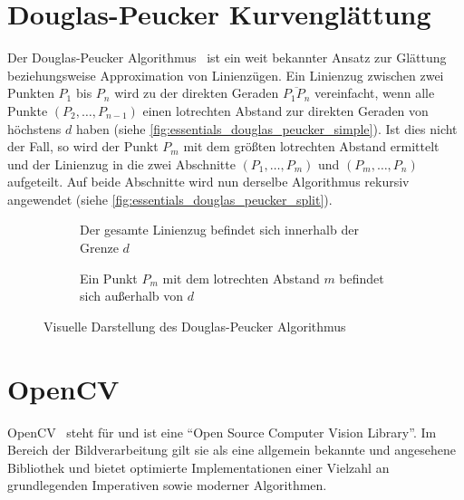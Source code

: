 \clearpage
\section{Douglas-Peucker Kurvenglättung}%
\label{sec:essentials_douglas_peucker}

Der Douglas-Peucker Algorithmus~\cite{doi:10.3138/FM57-6770-U75U-7727} ist ein weit bekannter Ansatz zur Glättung beziehungsweise Approximation von Linienzügen.
Ein Linienzug zwischen zwei Punkten \(P_1\) bis \(P_n\) wird zu der direkten Geraden \(\overline{P_1 P_n}\) vereinfacht, wenn alle Punkte \((P_2, \ldots, P_{n-1})\) einen lotrechten Abstand zur direkten Geraden von höchstens \(d\) haben (siehe \autoref{fig:essentials_douglas_peucker_simple}).
Ist dies nicht der Fall, so wird der Punkt \(P_m\) mit dem größten lotrechten Abstand ermittelt und der Linienzug in die zwei Abschnitte \((P_1, \ldots, P_m)\) und \((P_m, \ldots, P_n)\) aufgeteilt.
Auf beide Abschnitte wird nun derselbe Algorithmus rekursiv angewendet (siehe \autoref{fig:essentials_douglas_peucker_split}).

\mbox{}

\begin{figure}[htbp]
    \centering
    \begin{subfigure}[t]{0.45\textwidth}
        \centering
        
        \caption{Der gesamte Linienzug befindet sich innerhalb der Grenze \(d\)}%
        \label{fig:essentials_douglas_peucker_simple}
    \end{subfigure}
    \hfill
    \begin{subfigure}[t]{0.45\textwidth}
        \centering
        
        \caption{Ein Punkt \(P_m\) mit dem lotrechten Abstand \(m\) befindet sich außerhalb von \(d\)}%
        \label{fig:essentials_douglas_peucker_split}
    \end{subfigure}
    \caption{Visuelle Darstellung des Douglas-Peucker Algorithmus}
\end{figure}

\clearpage
\section{OpenCV}%
\label{sec:essentials_opencv}

OpenCV~\cite{opencv_library} steht für und ist eine \enquote{Open Source Computer Vision Library}.
Im Bereich der Bildverarbeitung gilt sie als eine allgemein bekannte und angesehene Bibliothek und bietet optimierte Implementationen einer Vielzahl an grundlegenden Imperativen sowie moderner Algorithmen.

